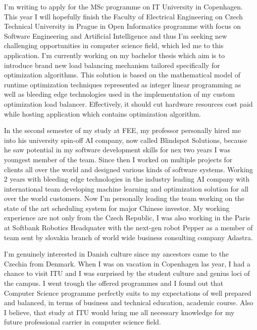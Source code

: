 \documentclass[11pt, a4paper]{awesome-cv} %
\begin{document}
\makecvheader %

\makelettertitle %


\begin{cvletter}


I'm writing to apply for the MSc programme on IT University in Copenhagen. 
This year I will hopefully finish the Faculty of Electrical Engineering on Czech Technical University in Prague in Open Informatics programme 
with focus on Software Engineering and Artificial Intelligence and
thus I'm seeking new challenging opportunities in computer science field, which led me to this application.
I'm currently working on my bachelor thesis which aim is to introduce brand new load balancing mechanism tailored specifically for optimization algorithms.
This solution is based on the mathematical model of runtime optimization techniques represented as integer linear programming as well as 
bleeding edge technologies used in the implementation of my custom optimization load balancer. 
Effectively, it should cut hardware resources cost paid while hosting application which contains optimization algorithm.

In the second semester of my study at FEE, 
my professor personally hired me into his university spin-off AI company, now called Blindspot Solutions,
because he saw potential in my software development skills for nex two years I was youngest member of the team.
Since then I worked on multiple projects for clients all over the world and designed various kinds of software systems.
Working 2 years with bleeding edge technologies in the industry leading AI company with international team developing machine learning and optimization solution for all over the world customers. 
Now I'm personally leading the team working on the state of the art scheduling system for major Chinese investor.
My working experience are not only from the Czech Republic,
I was also working in the Paris at Softbank Robotics Headquater with the next-gen robot Pepper as a member of team sent by slovakia branch of world wide business consulting company Adastra.


I'm genuinely interested in Danish culture since my ancestors came to the Czechia from Denmark.
When I was on vacation in Copenhagen las year,
I had a chance to visit ITU and I was surprised by the student culture and genius loci of the campus.
I went trough the offered programmes and I found out that Computer Science programme perfectly suits to my expectations 
of well prepared and balanced, in terms of business and technical education, academic course.
Also I believe, that study at ITU would bring me all necessary knowledge for my future professional carrier in computer science field.



\end{cvletter}
\end{document}
